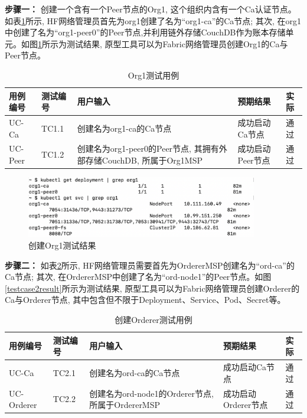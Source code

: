 \textbf{步骤一：} 创建一个含有一个Peer节点的Org1, 这个组织内含有一个Ca认证节点。如表\ref{org1_test}所示, HF网络管理员首先为org1创建了名为“org1-ca”的Ca节点; 其次, 在org1中创建了名为“org1-peer0”的Peer节点,并利用链外存储CouchDB作为账本存储单元。如图\ref{testcase1result}所示为测试结果, 原型工具可以为Fabric网络管理员创建Org1的Ca与Peer节点。

{\footnotesize
\begin{longtable}[h]{m{45pt} m{45pt} m{180pt} m{50pt} m{20pt}}
    \caption[创建Org1测试用例]{Org1测试用例} \label{org1_test}\\
        \hline  
        用例编号&测试编号&用户输入&预期结果&实际\\
        \hline
        UC-Ca & TC1.1 & 创建名为org1-ca的Ca节点 & 成功启动Ca节点 & 通过 \\
        \hline
        UC-Peer & TC1.2 & 创建名为org1-peer0的Peer节点, 其拥有外部存储CouchDB, 所属于Org1MSP & 成功启动Peer节点 & 通过 \\
        \hline
    \end{longtable} 
}

\begin{figure}[h] %
    \centering %
    \includegraphics[width=0.9\textwidth]{FIGs/chapter5/peer.png} %
    \caption{创建Org1测试结果} %
    \label{testcase1result} %
\end{figure}%

\textbf{步骤二：} 如表\ref{orderer_test}所示, HF网络管理员需要首先为OrdererMSP创建名为“ord-ca”的Ca节点; 其次, 在OrdererMSP中创建了名为“ord-node1”的Peer节点。如图\ref{testcase2result}所示为测试结果, 原型工具可以为Fabric网络管理员创建Orderer的Ca与Orderer节点, 其中包含但不限于Deployment、Service、Pod、Secret等。

{\footnotesize
\begin{longtable}[h]{m{45pt} m{45pt} m{180pt} m{50pt} m{20pt}}
    \caption[创建Orderer测试用例]{创建Orderer测试用例} \label{orderer_test}\\
        \hline  
        用例编号&测试编号&用户输入&预期结果&实际\\
        \hline
        UC-Ca & TC2.1 & 创建名为ord-ca的Ca节点 & 成功启动Ca节点 & 通过 \\
        \hline
        UC-Orderer & TC2.2 & 创建名为ord-node1的Orderer节点, 所属于OrdererMSP & 成功启动Orderer节点 & 通过 \\
        \hline
    \end{longtable} 
}

